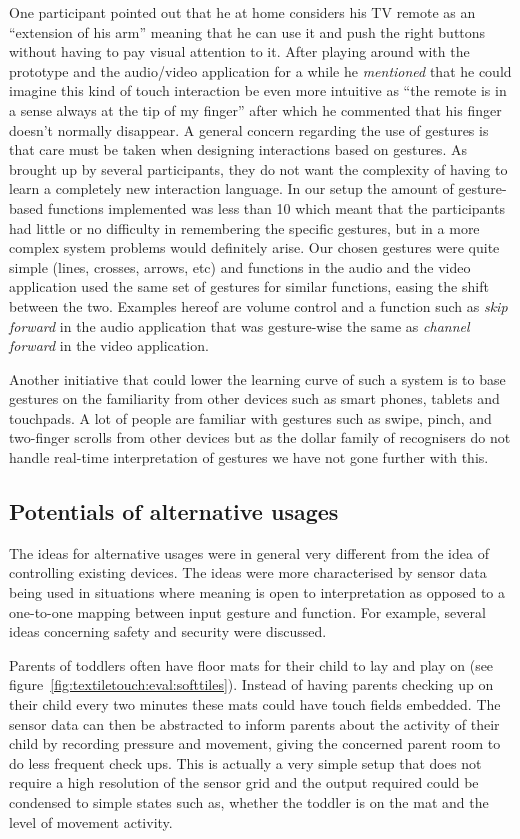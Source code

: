 One participant pointed out that he at home considers his TV remote as an ``extension of his arm'' meaning that he can use it and push the right buttons without having to pay visual attention to it. 
After playing around with the prototype and the audio/video application for a while he \emph{mentioned} that he could imagine this kind of touch interaction be even more intuitive as ``the remote is in a sense always at the tip of my finger'' after which he commented that his finger doesn't normally disappear.
\blank
A general concern regarding the use of gestures is that care must be taken when designing interactions based on gestures.
As brought up by several participants, they do not want the complexity of having to learn a completely new interaction language.
In our setup the amount of gesture-based functions implemented was less than 10 which meant that the participants had little or no difficulty in remembering the specific gestures, but in a more complex system problems would definitely arise.
Our chosen gestures were quite simple (lines, crosses, arrows, etc) and functions in the audio and the video application used the same set of gestures for similar functions, easing the shift between the two.
Examples hereof are volume control and a function such as \emph{skip forward} in the audio application that was gesture-wise the same as \emph{channel forward} in the video application.

Another initiative that could lower the learning curve of such a system is to base gestures on the familiarity from other devices such as smart phones, tablets and touchpads.
A lot of people are familiar with gestures such as swipe, pinch, and two-finger scrolls from other devices but as the dollar family of recognisers do not handle real-time interpretation of gestures we have not gone further with this.

\subsection{Potentials of alternative usages}

The ideas for alternative usages were in general very different from the idea of controlling existing devices.
The ideas were more characterised by sensor data being used in situations where meaning is open to interpretation as opposed to a one-to-one mapping between input gesture and function.
For example, several ideas concerning safety and security were discussed.

Parents of toddlers often have floor mats for their child to lay and play on (see figure~\ref{fig:textiletouch:eval:softtiles}).
Instead of having parents checking up on their child every two minutes these mats could have touch fields embedded.
The sensor data can then be abstracted to inform parents about the activity of their child by recording pressure and movement, giving the concerned parent room to do less frequent check ups.
This is actually a very simple setup that does not require a high resolution of the sensor grid and the output required could be condensed to simple states such as, whether the toddler is on the mat and the level of movement activity.

